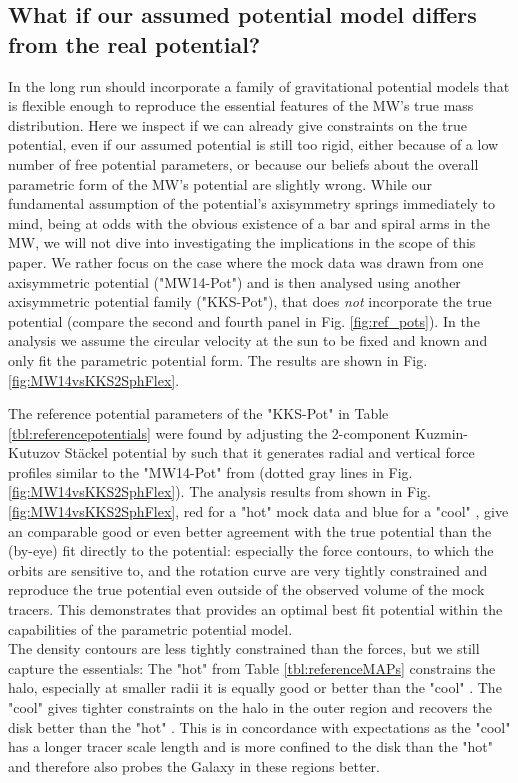 \subsection{What if our assumed potential model differs from the real potential?} \label{sec:results_potential}


In the long run \RM should incorporate a family of gravitational potential models that is flexible enough to reproduce the essential features of the MW's true mass distribution. Here we inspect if we can already give constraints on the true potential, even if our assumed potential is still too rigid, either because of a low number of free potential parameters, or because our beliefs about the overall parametric form of the MW's potential are slightly wrong. While our fundamental assumption of the potential's axisymmetry springs immediately to mind, being at odds with the obvious existence of a bar and spiral arms in the MW, we will not dive into investigating the implications in the scope of this paper. We rather focus on the case where the mock data was drawn from one axisymmetric potential ("MW14-Pot") and is then analysed using another axisymmetric potential family ("KKS-Pot"), that does \emph{not} incorporate the true potential (compare the second and fourth panel in Fig. \ref{fig:ref_pots}). In the analysis we assume the circular velocity at the sun to be fixed and known and only fit the parametric potential form. The results are shown in Fig. \ref{fig:MW14vsKKS2SphFlex}.





The reference potential parameters of the "KKS-Pot" in Table \ref{tbl:referencepotentials} were found by adjusting the 2-component Kuzmin-Kutuzov St\"{a}ckel potential by \citet{bat94} such that it generates radial and vertical force profiles similar to the "MW14-Pot" from \citet{bov15} (dotted gray lines in Fig. \ref{fig:MW14vsKKS2SphFlex}). The analysis results from \RM shown in Fig. \ref{fig:MW14vsKKS2SphFlex}, red for a "hot" mock data \MAP and blue for a "cool" \MAP, give an comparable good or even better agreement with the true potential than the (by-eye) fit directly to the potential: especially the force contours, to which the orbits are sensitive to, and the rotation curve are very tightly constrained and reproduce the true potential even outside of the observed volume of the mock tracers. This demonstrates that \RM provides an optimal best fit potential within the capabilities of the parametric potential model.
\\The density contours are less tightly constrained than the forces, but we still capture the essentials: The "hot" \MAP from Table \ref{tbl:referenceMAPs} constrains the halo, especially at smaller radii it is equally good or better than the "cool" \MAP. The "cool" \MAP gives tighter constraints on the halo in the outer region and recovers the disk better than the "hot" \MAP. This is in concordance with expectations as the "cool" \MAP has a longer tracer scale length and is more confined to the disk than the "hot" \MAP and therefore also probes the Galaxy in these regions better.

